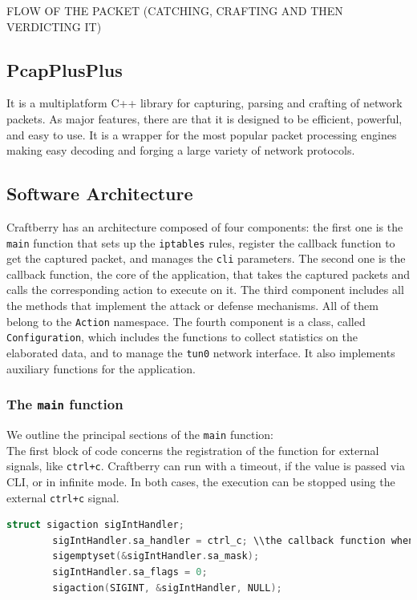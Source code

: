 \documentclass[12pt]{article}
\begin{document}
	FLOW OF THE PACKET (CATCHING, CRAFTING AND THEN VERDICTING IT)

	\subsection{PcapPlusPlus}
	It is a multiplatform C++ library for capturing, parsing and crafting of network packets. As major features, there are that it is designed to be efficient, powerful, and easy to use. It is a wrapper for the most popular packet processing engines making easy decoding and forging a large variety of network protocols.

	\subsection{Software Architecture}
	Craftberry has an architecture composed of four components: the first one is the \lstinline{main} function that sets up the \lstinline{iptables} rules, register the callback function to get the captured packet, and manages the \lstinline{cli} parameters. The second one is the callback function, the core of the application, that takes the captured packets and calls the corresponding action to execute on it. The third component includes all the methods that implement the attack or defense mechanisms. All of them belong to the \lstinline{Action} namespace. The fourth component is a class, called \lstinline{Configuration}, which includes the functions to collect statistics on the elaborated data, and to manage the \lstinline{tun0} network interface. It also implements auxiliary functions for the application.\\

	\subsubsection{The \lstinline{main} function}

	We outline the principal sections of the \lstinline{main} function:\\
	The first block of code concerns the registration of the function for external signals, like \lstinline{ctrl+c}. Craftberry can run with a timeout, if the value is passed via CLI, or in infinite mode. In both cases, the execution can be stopped using the external \lstinline{ctrl+c} signal.\\
	\bigbreak

	\begin{lstlisting}[frame=single, language=C++]
		struct sigaction sigIntHandler;
		sigIntHandler.sa_handler = ctrl_c; \\the callback function when the signal is emitted
		sigemptyset(&sigIntHandler.sa_mask);
		sigIntHandler.sa_flags = 0;
		sigaction(SIGINT, &sigIntHandler, NULL);
	\end{lstlisting}
	\bigbreak
	
\end{document}
